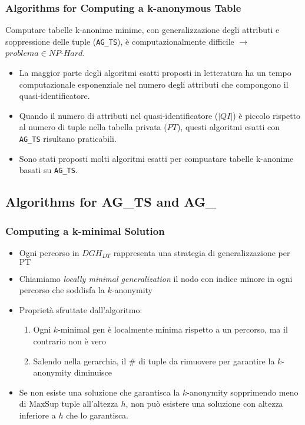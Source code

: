\documentclass{report}
\begin{document}
\subsubsection{Algorithms for Computing a k-anonymous Table}
Computare tabelle k-anonime minime, con generalizzazione degli attributi e soppressione delle tuple (\texttt{AG\_TS}), è computazionalmente difficile $ \rightarrow $ \(problema \in NP\text{-}Hard \). 
\begin{itemize}
    \item La maggior parte degli algoritmi esatti proposti in letteratura ha un tempo computazionale esponenziale nel numero degli attributi che compongono il quasi-identificatore.
    \item Quando il numero di attributi nel quasi-identificatore (\(|QI|\)) è piccolo rispetto al numero di tuple nella tabella privata (\(PT\)), questi algoritmi esatti con \texttt{AG\_TS} risultano praticabili.
    \item Sono stati proposti molti algoritmi esatti per compuatare tabelle k-anonime basati su \texttt{AG\_TS}.
\end{itemize}


\subsection{Algorithms for \textbf{AG\_TS} and \textbf{AG\_}}

\subsubsection{Computing a k-minimal Solution}

\begin{itemize}
    \item Ogni percorso in $ DGH_{DT} $ rappresenta una strategia di generalizzazione per \( \text{PT} \)
    \item Chiamiamo \textit{locally minimal generalization} il nodo con indice minore in ogni percorso che soddisfa la \( k \)-anonymity
    \item Proprietà sfruttate dall'algoritmo:
    \begin{enumerate}
        \item Ogni \( k \)-minimal gen è localmente minima rispetto a un percorso, ma il contrario non è vero
        \item Salendo nella gerarchia, il \# di tuple da rimuovere per garantire la \( k \)-anonymity diminuisce
    \end{enumerate}
    \item Se non esiste una soluzione che garantisca la \( k \)-anonymity sopprimendo meno di \( \text{MaxSup} \) tuple all'altezza \( h \), non può esistere una soluzione con altezza inferiore a \( h \) che lo garantisca.
\end{itemize}
\end{document}
